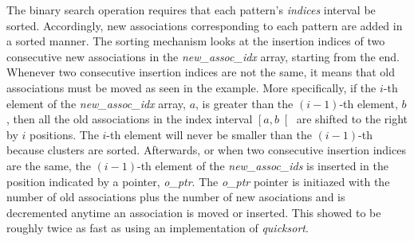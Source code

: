 The binary search operation requires that each pattern's \emph{indices} interval be sorted.
Accordingly, new associations corresponding to each pattern are added in a sorted manner.
The sorting mechanism looks at the insertion indices of two consecutive new associations in the \emph{new\_assoc\_idx} array, starting from the end.
Whenever two consecutive insertion indices are not the same, it means that old associations must be moved as seen in the example.
More specifically, if the $i$-th element of the \emph{new\_assoc\_idx} array, $a$, is greater than the $(i-1)$-th element, $b$, then all the old  associations in the index interval $ \left [ a,b  \right [$ are shifted to the right by $i$ positions. %
The $i$-th element will never be smaller than the $(i-1)$-th because clusters are sorted.
Afterwards, or when two consecutive insertion indices are the same, the $(i-1)$-th element of the \emph{new\_assoc\_ids} is inserted in the position indicated by a pointer, \emph{o\_ptr}.
The \emph{o\_ptr} pointer is initiazed with the number of old associations plus the number of new asociations and is decremented anytime an association is moved or inserted.
This showed to be roughly twice as fast as using an implementation of \emph{quicksort}.

